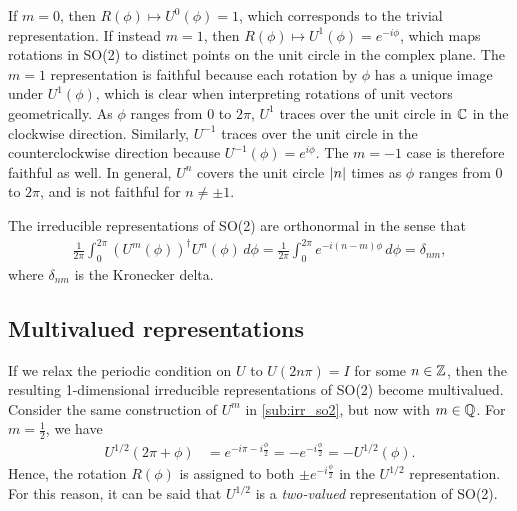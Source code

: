 If $m=0$, then $R(\phi)\mapsto U^0(\phi) = 1$, which corresponds to the trivial representation. If instead $m=1$, then $R(\phi)\mapsto U^1(\phi) = e^{-i\phi}$, which maps rotations in SO(2) to distinct points on the unit circle in the complex plane. The $m=1$ representation is faithful because each rotation by $\phi$ has a unique image under $U^1(\phi)$, which is clear when interpreting rotations of unit vectors geometrically. As $\phi$ ranges from 0 to $2\pi$, $U^1$ traces over the unit circle in $\mathbb{C}$ in the clockwise direction. Similarly, $U^{-1}$ traces over the unit circle in the counterclockwise direction because $U^{-1}(\phi)=e^{i\phi}$. The $m=-1$ case is therefore faithful as well. In general, $U^n$ covers the unit circle $\left|n\right|$ times as $\phi$ ranges from 0 to $2\pi$, and is not faithful for $n\neq\pm1$.

The irreducible representations of SO(2) are orthonormal in the sense that
\begin{align*}
    \frac{1}{2\pi}\int_{0}^{2\pi}{(U^m(\phi))}^\dagger U^n(\phi) \,d\phi = \frac{1}{2\pi}\int_{0}^{2\pi} e^{-i(n-m)\phi} \,d\phi = \delta_{nm},
\end{align*}
where $\delta_{nm}$ is the Kronecker delta.

\subsection{Multivalued representations}\label{sub:multi_so2}
If we relax the periodic condition on $U$ to $U(2n\pi) = I$ for some $n\in\mathbb{Z}$, then the resulting 1-dimensional irreducible representations of SO(2) become multivalued. Consider the same construction of $U^m$ in \cref{sub:irr_so2}, but now with $m\in\mathbb{Q}$. For $m=\frac{1}{2}$, we have
\begin{align*}
    U^{1/2}(2\pi + \phi) &= e^{-i\pi -i\frac{\phi}{2}} = -e^{-i\frac{\phi}{2}} = -U^{1/2}(\phi).
\end{align*}
Hence, the rotation $R(\phi)$ is assigned to both $\pm e^{-i\frac{\phi}{2}}$ in the $U^{1/2}$ representation. For this reason, it can be said that $U^{1/2}$ is a \textit{two-valued} representation of SO(2).

